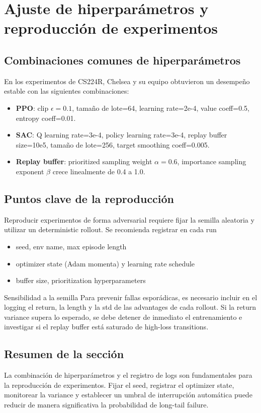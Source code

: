 \section{Ajuste de hiperparámetros y reproducción de experimentos}

\subsection{Combinaciones comunes de hiperparámetros}

En los experimentos de CS224R, Chelsea y su equipo obtuvieron un desempeño estable con las siguientes combinaciones:

\begin{itemize}
    \item \textbf{PPO}: clip $\epsilon=0.1$, tamaño de lote=64, learning rate=2e-4, value coeff=0.5, entropy coeff=0.01.
    \item \textbf{SAC}: Q learning rate=3e-4, policy learning rate=3e-4, replay buffer size=10e5, tamaño de lote=256, target smoothing coeff=0.005.
    \item \textbf{Replay buffer}: prioritized sampling weight $\alpha=0.6$, importance sampling exponent $\beta$ crece linealmente de 0.4 a 1.0.
\end{itemize}

\subsection{Puntos clave de la reproducción}

Reproducir experimentos de forma adversarial requiere fijar la semilla aleatoria y utilizar un deterministic rollout. Se recomienda registrar en cada run

\begin{itemize}
    \item seed, env name, max episode length
    \item optimizer state (Adam momenta) y learning rate schedule
    \item buffer size, prioritization hyperparameters
\end{itemize}

\begin{warningbox}{Sensibilidad a la semilla}
Para prevenir fallas esporádicas, es necesario incluir en el logging el return, la length y la std de las advantages de cada rollout. Si la return variance supera lo esperado, se debe detener de inmediato el entrenamiento e investigar si el replay buffer está saturado de high-loss transitions.
\end{warningbox}

\subsection{Resumen de la sección}

La combinación de hiperparámetros y el registro de logs son fundamentales para la reproducción de experimentos. Fijar el seed, registrar el optimizer state, monitorear la variance y establecer un umbral de interrupción automática puede reducir de manera significativa la probabilidad de long-tail failure.
